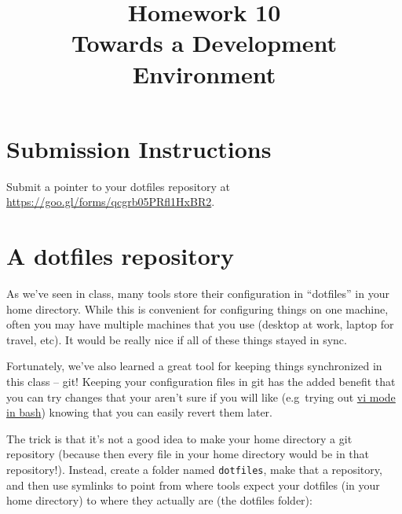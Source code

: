 \documentclass{article}
\begin{document}

\fancyfoot[C]{\color{gray} \thepage~/~\pageref*{LastPage}}
\pagestyle{fancyplain}



\title{\textbf{Homework 10\\Towards a Development Environment}}
\author{\textbf{\color{red}{Due: Saturday, November 19, 10:00PM (Hard Deadline)}}}
\date{}
\maketitle


\section*{Submission Instructions}
Submit a pointer to your dotfiles repository at
\href{https://goo.gl/forms/qcgrb05PRfl1HxBR2}{https://goo.gl/forms/qcgrb05PRfl1HxBR2}.

\section{A dotfiles repository}

As we've seen in class, many tools store their configuration in ``dotfiles''
in your home directory. While this is convenient for configuring things on one
machine, often you may have multiple machines that you use (desktop at
work, laptop for travel, etc). It would be really nice if all of these things
stayed in sync.

Fortunately, we've also learned a great tool for keeping things synchronized
in this class -- git! Keeping your configuration files in git has the added
benefit that you can try changes that your aren't sure if you will like
(e.g\ trying out \href{http://blog.sanctum.geek.nz/vi-mode-in-bash/}{vi mode
in bash}) knowing that you can easily revert them later.

The trick is that it's not a good idea to make your home directory a git
repository (because then every file in your home directory would be in that
repository!). Instead, create a folder named \texttt{dotfiles}, make that a
repository, and then use symlinks to point from where tools expect your
dotfiles (in your home directory) to where they actually are (the dotfiles
folder):
\end{document}
